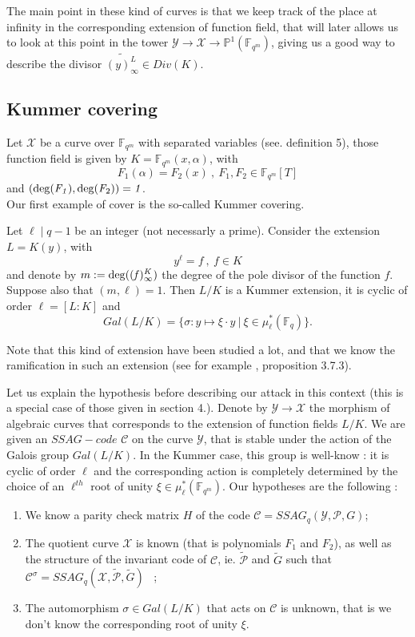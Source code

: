 \documentclass[10pt]{article}
\newcommand{\s}{\vspace{0.3cm}}
\newcommand{\cd}{\cdot}
\newcommand{\fqm}{\mathbb{F}_{q^m}}
\newcommand{\fq}{\mathbb{F}_q}
\newcommand{\X}{\mathcal{X}}
\newcommand{\Y}{\mathcal{Y}}
\newcommand{\PR}{\mathcal{P}}
\begin{document}
\s

The main point in these kind of curves is that we keep track of the place at infinity in the corresponding extension of function field, that will later allows us to look at this point in the tower $\Y \rightarrow \X \rightarrow \mathbb{P}^1(\fqm)$, giving us a good way to describe the divisor $\widetilde{(y)_{\infty}^L} \in Div(K)$.


\s

\subsection{Kummer covering}

\s

Let $\X$ be a curve over $\fqm$ with separated variables (see. definition 5), those function field is given by $K=\fqm(x,\alpha)$, with
\[F_1(\alpha) = F_2(x) \ , \ F_1,F_2 \in \fqm[T] \]
and $(\rm{deg}\it(F_1),\rm{deg}\it(F_{\rm{2}}))=1$.  \\
Our first example of cover is the so-called Kummer covering.

\s

Let $\ell \mid q-1$ be an integer (not necessarly a prime). Consider the extension $L=K(y)$, with
\[y^{\ell} = f \ , \ f \in K\]
and denote by $m:=\rm{deg}\it((f)_{\infty}^K)$ the degree of the pole divisor of the function $f$. Suppose also that $(m,\ell)=1$. Then $L/K$ is a Kummer extension, it is cyclic of order $\ell=[L:K]$ and 
\[Gal(L/K) = \{ \sigma : y \mapsto \xi \cd y \ | \ \xi \in \mu^*_{\ell}(\fq)\}.\] 

\s

Note that this kind of extension have been studied a lot, and that we know the ramification in such an extension (see for example \cite{Sti}, proposition 3.7.3).

Let us explain the hypothesis before describing our attack in this context (this is a special case of those given in section 4.). Denote by $\Y \rightarrow \X$ the morphism of algebraic curves that corresponds to the extension of function fields $L/K$. We are given an $SSAG-code$ $\mathcal{C}$ on the curve $\Y$, that is stable under the action of the Galois group $Gal(L/K)$. In the Kummer case, this group is well-know :  it is cyclic of order $\ell$ and the corresponding action is completely determined by the choice of an $\ell^{th}$ root of unity $\xi \in \mu^*_{\ell}(\fqm)$. Our hypotheses are the following :

\s

\begin{enumerate}
\item We know a parity check matrix $H$ of the code $\mathcal{C} = SSAG_q(\Y,\PR,G)$;
\item The quotient curve $\X$ is known (that is polynomials $F_1$ and $F_2$), as well as the structure of the invariant code of $\mathcal{C}$, ie. $\tilde{\PR}$ and $\tilde{G}$ such that $\mathcal{C}^{\sigma} = SSAG_q(\X,\tilde{\PR},\tilde{G})$ \ ;
\item The automorphism $\sigma \in Gal(L/K)$ that acts on $\mathcal{C}$ is unknown, that is we don't know the corresponding root of unity $\xi$.
\end{enumerate}
\end{document}
